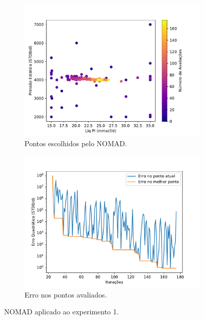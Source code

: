 \begin{figure}[H]
\centering
\begin{subfigure}{0.5\textwidth}
  \centering
  \includegraphics[width=1\linewidth]{figs/setup1_eval_points.pdf}
  \caption{Pontos escolhidos pelo NOMAD.}
  \label{fig:setup1_points}
\end{subfigure}%
\begin{subfigure}{0.5\textwidth}
  \centering
  \includegraphics[width=1\linewidth]{figs/setup1_errors.pdf}
  \caption{Erro nos pontos avaliados.}
  \label{fig:setup1_error}
\end{subfigure}
\caption{NOMAD aplicado ao experimento 1.}
\label{fig:setup1_2}
\end{figure}

